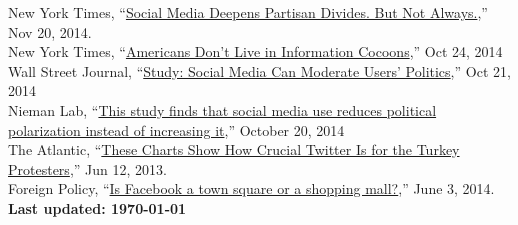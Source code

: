 \documentclass[margin,line,11pt]{resume}
\newcommand{\nl}{\vspace{0.10in}\\}
\begin{document}
\begin{resume}
New York Times, ``\href{http://www.nytimes.com/2014/11/21/upshot/social-media-deepens-partisan-divides-but-not-always.html?_r=0}{Social Media Deepens Partisan Divides. But Not Always.},'' Nov 20, 2014.\nl
New York Times, ``\href{http://www.nytimes.com/2014/10/25/upshot/americans-dont-live-in-information-cocoons.html?_r=0}{Americans Don't Live in Information Cocoons},'' Oct 24, 2014\nl
Wall Street Journal, ``\href{http://blogs.wsj.com/washwire/2014/10/21/study-social-media-can-moderate-users-politics/}{Study: Social Media Can Moderate Users' Politics},'' Oct 21, 2014\nl
Nieman Lab, ``\href{http://www.niemanlab.org/2014/10/this-study-finds-that-social-media-use-reduces-political-polarization-instead-of-increasing-it/}{This study finds that social media use reduces political polarization instead of increasing it},'' October 20, 2014\nl
The Atlantic, ``\href{http://www.theatlantic.com/international/archive/2013/06/these-charts-show-how-crucial-twitter-is-for-the-turkey-protesters/276798/}{These Charts Show How Crucial Twitter Is for the Turkey Protesters},'' Jun 12, 2013.\nl
Foreign Policy, ``\href{http://foreignpolicy.com/2013/06/03/is-facebook-a-town-square-or-a-shopping-mall/}{Is Facebook a town square or a shopping mall?},'' June 3, 2014.\nl

\centering \textbf{Last updated: \today}
    
\end{resume}
\end{document}
